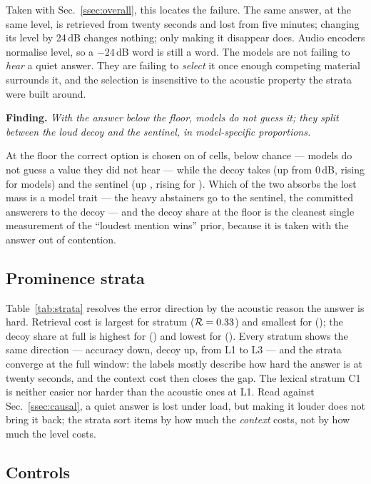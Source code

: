 \documentclass{article}
\newcommand{\finding}[1]{\par\smallskip\noindent\textbf{Finding.} \emph{#1}\par\smallskip}
\begin{document}
Taken with Sec.~\ref{ssec:overall}, this locates the failure. The same
answer, at the same level, is retrieved from twenty seconds and lost from
five minutes; changing its level by 24\,dB changes nothing; only making it
disappear does. Audio encoders normalise level, so a $-24$\,dB word is still
a word. The models are not failing to \emph{hear} a quiet answer. They are
failing to \emph{select} it once enough competing material surrounds it,
and the selection is insensitive to the acoustic property the strata were
built around.

\finding{With the answer below the floor, models do not guess it; they split
between the loud decoy and the sentinel, in model-specific proportions.}
At the floor the correct option is chosen on \sweeprmCorrect{} of cells,
below chance --- models do not guess a value they did not hear --- while the
decoy takes \sweeprmSalience{} (up \sweepDecoyRise{} from 0\,dB, rising for
\signSweepDecoyUp{} models) and the sentinel \sweeprmAbsent{} (up
\sweepDenialRise{}, rising for \signSweepDenialUp{}). Which of the two
absorbs the lost mass is a model trait --- the heavy abstainers go to the
sentinel, the committed answerers to the decoy --- and the decoy share at
the floor is the cleanest single measurement of the ``loudest mention
wins'' prior, because it is taken with the answer out of contention.

\subsection{Prominence strata}
\label{ssec:strata_results}
Table~\ref{tab:strata} resolves the error direction by the acoustic reason
the answer is hard. Retrieval cost is largest for stratum \catRmaxName{}
($\mathcal{R}=0.33{}$) and smallest for \catRminName{}
(\catRminVal{}); the decoy share at full is highest for \catDecMaxName{}
(\catDecMaxVal{}) and lowest for \catDecMinName{} (\catDecMinVal{}). Every
stratum shows the same direction --- accuracy down, decoy up, from L1 to L3
--- and the strata converge at the full window: the labels mostly describe
how hard the answer is at twenty seconds, and the context cost then closes
the gap. The lexical stratum C1 is neither easier nor harder than the
acoustic ones at L1. Read against Sec.~\ref{ssec:causal}, a quiet answer is
lost under load, but making it louder does not bring it back; the strata
sort items by how much the \emph{context} costs, not by how much the level
costs.

\subsection{Controls}
\label{ssec:controls}
\end{document}
